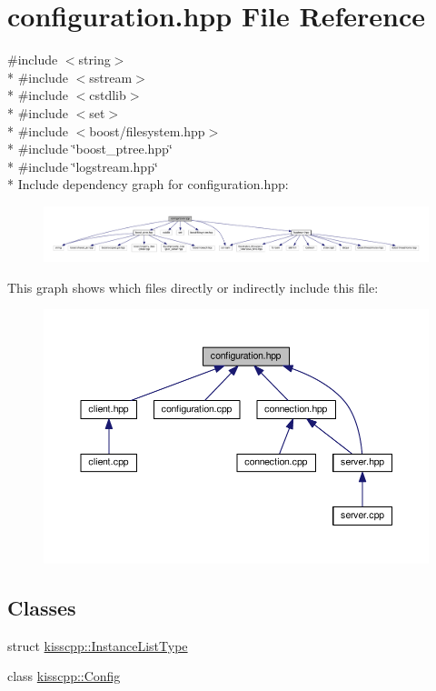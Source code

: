 \hypertarget{a00053}{\section{configuration.\-hpp File Reference}
\label{a00053}
}
{\ttfamily \#include $<$string$>$}\\*
{\ttfamily \#include $<$sstream$>$}\\*
{\ttfamily \#include $<$cstdlib$>$}\\*
{\ttfamily \#include $<$set$>$}\\*
{\ttfamily \#include $<$boost/filesystem.\-hpp$>$}\\*
{\ttfamily \#include \char`\"{}boost\-\_\-ptree.\-hpp\char`\"{}}\\*
{\ttfamily \#include \char`\"{}logstream.\-hpp\char`\"{}}\\*
Include dependency graph for configuration.\-hpp\-:\nopagebreak
\begin{figure}[H]
\begin{center}
\leavevmode
\includegraphics[width=350pt]{a00099}
\end{center}
\end{figure}
This graph shows which files directly or indirectly include this file\-:\nopagebreak
\begin{figure}[H]
\begin{center}
\leavevmode
\includegraphics[width=350pt]{a00100}
\end{center}
\end{figure}
\subsection*{Classes}
\begin{DoxyCompactItemize}
\item 
struct \hyperlink{a00028}{kisscpp\-::\-Instance\-List\-Type}
\item 
class \hyperlink{a00021}{kisscpp\-::\-Config}
\end{DoxyCompactItemize}

